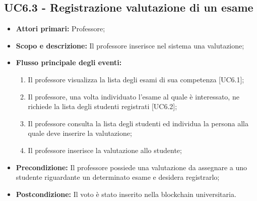 \documentclass[AnalisiDeiRequisiti.tex]{subfiles}
\begin{document}
\subsection{UC6.3 - Registrazione valutazione di un esame}
\begin{itemize}
	\item \textbf{Attori primari:} Professore;\\
	\item \textbf{Scopo e descrizione:} Il professore inserisce nel sistema una valutazione;\\
	\item \textbf{Flusso principale degli eventi:}\\
	\begin{enumerate}
		\item Il professore visualizza la lista degli esami di sua competenza [UC6.1];
		\item Il professore, una volta individuato l'esame al quale è interessato, ne richiede la lista degli studenti registrati [UC6.2];
		\item Il professore consulta la lista degli studenti ed individua la persona alla quale deve inserire la valutazione;
		\item Il professore inserisce la valutazione allo studente;
	\end{enumerate}
	\item \textbf{Precondizione:} Il professore possiede una valutazione da assegnare a uno studente riguardante un determinato esame e desidera registrarlo;\\
	\item \textbf{Postcondizione:} Il voto è stato inserito nella blockchain universitaria.\\
\end{itemize}
\end{document}
